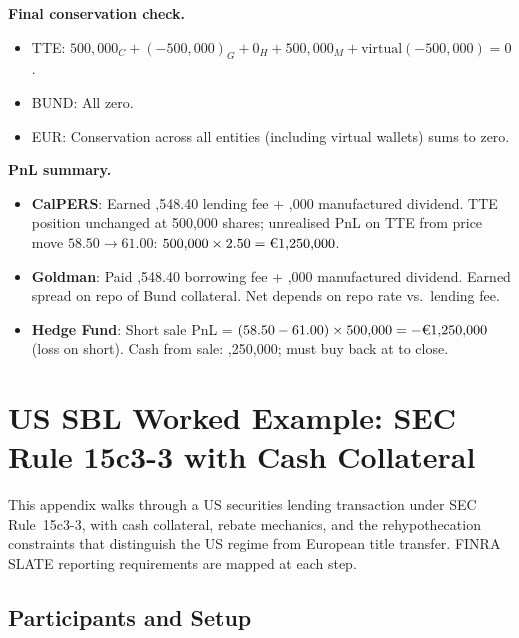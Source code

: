 \documentclass[11pt,a4paper]{article}
\newcommand{\EUR}[1]{\texteuro#1}
\begin{document}
\noindent\textbf{Final conservation check.}
\begin{itemize}[nosep]
\item TTE: $500{,}000_C + (-500{,}000)_G + 0_H + 500{,}000_M + \text{virtual}(-500{,}000) = 0$. \checkmark
\item BUND: All zero. \checkmark
\item EUR: Conservation across all entities (including virtual wallets) sums to zero. \checkmark
\end{itemize}

\noindent\textbf{PnL summary.}
\begin{itemize}[nosep]
\item \textbf{CalPERS}: Earned \EUR{3,548.40} lending fee + \EUR{625,000} manufactured dividend. TTE position unchanged at 500{,}000 shares; unrealised PnL on TTE from price move $58.50 \to 61.00$: $500{,}000 \times 2.50 = \text{\EUR{1,250,000}}$.
\item \textbf{Goldman}: Paid \EUR{3,548.40} borrowing fee + \EUR{625,000} manufactured dividend. Earned spread on repo of Bund collateral. Net depends on repo rate vs.\ lending fee.
\item \textbf{Hedge Fund}: Short sale PnL = $(58.50 - 61.00) \times 500{,}000 = -\text{\EUR{1,250,000}}$ (loss on short). Cash from sale: \EUR{29,250,000}; must buy back at \EUR{61.00} to close.
\end{itemize}

\clearpage
\section{US SBL Worked Example: SEC Rule 15c3-3 with Cash Collateral}
\label{app:us-sbl-example}

This appendix walks through a US securities lending transaction under SEC Rule~15c3-3, with cash collateral, rebate mechanics, and the rehypothecation constraints that distinguish the US regime from European title transfer. FINRA SLATE reporting requirements are mapped at each step.

\subsection{Participants and Setup}
\end{document}
